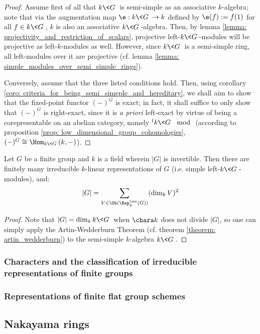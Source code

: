                 \begin{proof}
                    Assume first of all that $k\<G\>$ is semi-simple as an associative $k$-algebra; note that via the augmentation map $\e: k\<G\> \to k$ defined by $\e(f) := f(1)$ for all $f \in k\<G\>$, $k$ is also an associative $k\<G\>$-algebra. Then, by lemma \ref{lemma: projectivity_and_restriction_of_scalars}, projective left-$k\<G\>$-modules will be projective as left-$k$-modules as well. However, since $k\<G\>$ is a semi-simple ring, all left-modules over it are projective (cf. lemma \ref{lemma: simple_modules_over_semi_simple_rings}).
                    
                    Conversely, assume that the three listed conditions hold. Then, using corollary \ref{coro: criteria_for_being_semi_simeple_and_hereditary}, we shall aim to show that the fixed-point functor $(-)^G$ is exact; in fact, it shall suffice to only show that $(-)^G$ is right-exact, since it is \textit{a priori} left-exact by virtue of being a corepresentable on an abelian category, namely ${}^lk\<G\>\mod$ (according to proposition \ref{prop: low_dimensional_group_cohomologies}, $(-)^G \cong \Hom_{k\<G\>}(k, -)$).  
                \end{proof}
            \begin{example}
                
            \end{example}
            \begin{corollary} \label{coro: sum_of_squares_formula_for_finite_groups}
                Let $G$ be a finite group and $k$ is a field wherein $|G|$ is invertible. Then there are finitely many irreducible $k$-linear representations of $G$ (i.e. simple left-$k\<G\>$-modules), and:
                    $$|G| = \sum_{V \in \Ob(\Rep_k^{\irr}(G))} (\dim_k V)^2$$
            \end{corollary}
                \begin{proof}
                    Note that $|G| = \dim_k k\<G\>$ when $\chara k$ does not divide $|G|$, so one can simply apply the Artin-Wedderburn Theorem (cf. theorem \ref{theorem: artin_wedderburn}) to the semi-simple $k$-algebra $k\<G\>$.
                \end{proof}
                
        \subsubsection{Characters and the classification of irreducible representations of finite groups}
        
        \subsubsection{Representations of finite flat group schemes}
        
    \subsection{Nakayama rings}